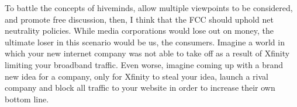 \documentclass[a4paper]{article}
\begin{document}
        To battle the concepts of hiveminds, allow multiple viewpoints to be considered, and promote free discussion, then, I think that the FCC should uphold net neutrality policies. While media corporations would 
        lose out on money, the ultimate loser in this scenario would be us, the consumers. Imagine a world in which your new internet company was not able to take off as a result of Xfinity limiting your broadband traffic. 
        Even worse, imagine coming up with a brand new idea for a company, only for Xfinity to steal your idea, launch a rival company and block all traffic to your website in order to increase their own bottom line. 


        \pagebreak
        
        
        \cite{lesson7}
        \cite{lesson8}
        \cite{vox}
        \cite{poll}
        \cite{video}
\end{document}
